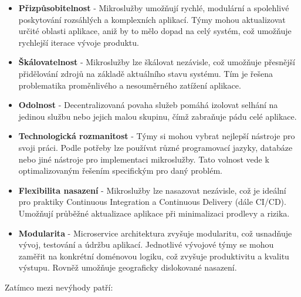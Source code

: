 \begin{itemize}

\item \textbf{Přizpůsobitelnost} - Mikroslužby umožňují rychlé, modulární a spolehlivé poskytování rozsáhlých a komplexních aplikací. Týmy mohou aktualizovat určité oblasti aplikace, aniž by to mělo dopad na celý systém, což umožňuje rychlejší iterace vývoje produktu.

\item \textbf{Škálovatelnost} - Mikroslužby lze škálovat nezávisle, což umožňuje přesnější přidělování zdrojů na základě aktuálního stavu systému. Tím je řešena problematika proměnlivého a nesouměrného zatížení aplikace.

\item \textbf{Odolnost} - Decentralizovaná povaha služeb pomáhá izolovat selhání na jedinou službu nebo jejich malou skupinu, čímž zabraňuje pádu celé aplikace.

\item \textbf{Technologická rozmanitost} - Týmy si mohou vybrat nejlepší nástroje pro svoji práci. Podle potřeby lze používat různé programovací jazyky, databáze nebo jiné nástroje pro implementaci mikroslužby. Tato volnost vede k optimalizovaným řešením specifickým pro daný problém.

\item \textbf{Flexibilita nasazení} - Mikroslužby lze nasazovat nezávisle, což je ideální pro praktiky Continuous Integration a Continuous Delivery (dále CI/CD). Umožňují průběžné aktualizace aplikace při minimalizaci prodlevy a rizika.

\item \textbf{Modularita} - Microservice architektura zvyšuje modularitu, což usnadňuje vývoj, testování a údržbu aplikací. Jednotlivé vývojové týmy se mohou zaměřit na konkrétní doménovou logiku, což zvyšuje produktivitu a kvalitu výstupu. Rovněž umožňuje geograficky dislokované nasazení.

\end{itemize}

Zatímco mezi nevýhody patří:

